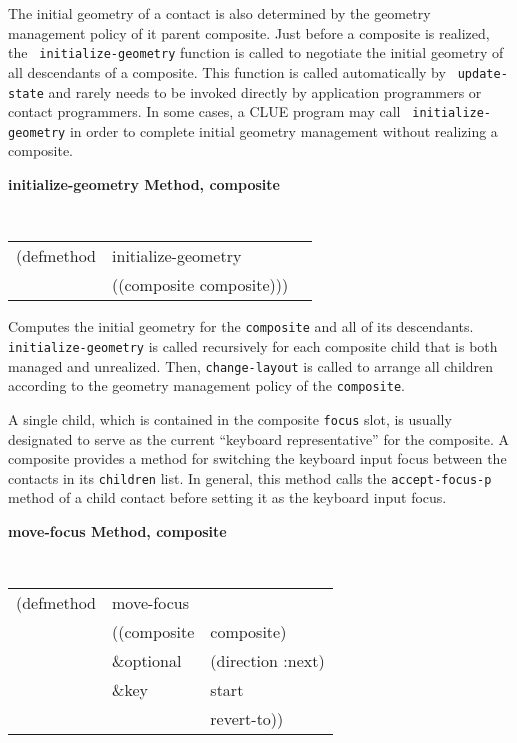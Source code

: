 \documentclass[twoside]{book}
\begin{document}
\begin{sloppy}
\begin{flushright}
{}\end{flushright}



The initial geometry of a contact is also determined by the geometry management
policy of it parent composite. Just before a composite is realized, the {\tt
initialize-geometry} function is called to negotiate the initial geometry of all
descendants of a composite. This function is called automatically by {\tt
update-state}
and rarely needs to be invoked directly by application programmers
or contact programmers. In some cases, a CLUE program may call {\tt
initialize-geometry} in order to complete initial geometry management without
realizing a composite.

{\samepage
{\large {\bf initialize-geometry \hfill Method, composite}}
\begin{flushright} \parbox[t]{6.125in}{
\tt
\begin{tabular}{lll}
\raggedright
(defmethod & initialize-geometry & \\
           & ((composite  composite)))
\end{tabular}
\rm

}\end{flushright}}

\begin{flushright} \parbox[t]{6.125in}{
Computes the initial geometry for the {\tt composite} and all of its
descendants. {\tt initialize-geometry} is called recursively for each composite
child that
is both managed and unrealized. Then, {\tt change-layout} is called to arrange
all children according to the geometry management policy of the {\tt composite}.

}\end{flushright}

 
{\samepage
{}
A single child, which is contained in the
composite {\tt focus} slot, is usually designated to serve as the current
``keyboard representative'' for the composite. 
A composite provides a method for switching the keyboard input focus
between
the contacts in its {\tt children} list. In general, this method calls the
{\tt accept-focus-p}
method of a child contact before setting it as the keyboard
input focus.
}

{\samepage
{\large {\bf move-focus \hfill Method, composite}}
\begin{flushright} \parbox[t]{6.125in}{
\tt
\begin{tabular}{lll}
\raggedright
(defmethod & move-focus \\
           & ((composite & composite)\\
           & \&optional & (direction :next) \\
           & \&key           & start\\
           & & revert-to))
\end{tabular}
\rm

}
\end{flushright}}
\end{sloppy}
\end{document}
